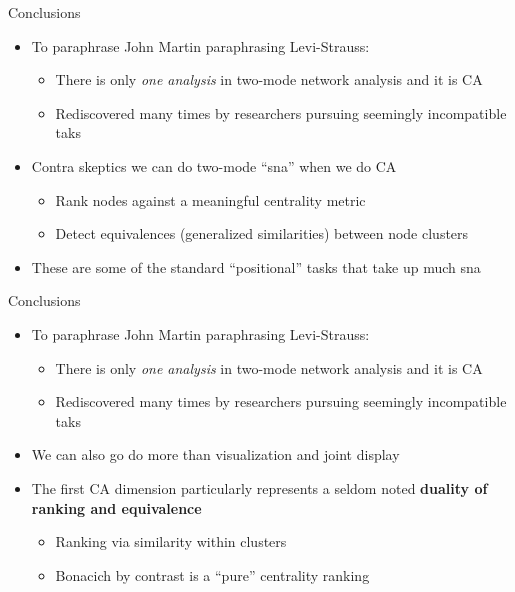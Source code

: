 \documentclass[
  ignorenonframetext,
]{beamer}
\providecommand{\tightlist}{%
  \setlength{\itemsep}{0pt}\setlength{\parskip}{0pt}}\usepackage{longtable,booktabs,array}
\begin{document}
\begin{frame}{Conclusions}
\protect\hypertarget{conclusions}{}
\begin{itemize}
\tightlist
\item
  To paraphrase John Martin paraphrasing Levi-Strauss:

  \begin{itemize}
  \tightlist
  \item
    There is only \emph{one analysis} in two-mode network analysis and
    it is CA
  \item
    Rediscovered many times by researchers pursuing seemingly
    incompatible taks
  \end{itemize}
\end{itemize}

\pause

\begin{itemize}
\tightlist
\item
  Contra skeptics we can do two-mode ``sna'' when we do CA

  \begin{itemize}
  \tightlist
  \item
    Rank nodes against a meaningful centrality metric
  \item
    Detect equivalences (generalized similarities) between node clusters
  \end{itemize}
\item
  These are some of the standard ``positional'' tasks that take up much
  sna
\end{itemize}
\end{frame}

\begin{frame}{Conclusions}
\protect\hypertarget{conclusions-1}{}
\begin{itemize}
\tightlist
\item
  To paraphrase John Martin paraphrasing Levi-Strauss:

  \begin{itemize}
  \tightlist
  \item
    There is only \emph{one analysis} in two-mode network analysis and
    it is CA
  \item
    Rediscovered many times by researchers pursuing seemingly
    incompatible taks
  \end{itemize}
\end{itemize}

\pause

\begin{itemize}
\tightlist
\item
  We can also go do more than visualization and joint display
\item
  The first CA dimension particularly represents a seldom noted
  \textbf{duality of ranking and equivalence}

  \begin{itemize}
  \tightlist
  \item
    Ranking via similarity within clusters
  \item
    Bonacich by contrast is a ``pure'' centrality ranking
  \end{itemize}
\end{itemize}
\end{frame}
\end{document}
